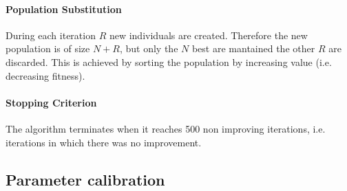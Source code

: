 \paragraph{Population Substitution} During each iteration $R$ new individuals are created. Therefore
the new population is of size $N+R$, but only the $N$ best are mantained the other $R$ are discarded.
This is achieved by sorting the population by increasing value (i.e. decreasing fitness).

\paragraph{Stopping Criterion} The algorithm terminates when it reaches 500 non improving iterations, i.e. 
iterations in which there was no improvement.


\subsection{Parameter calibration}
